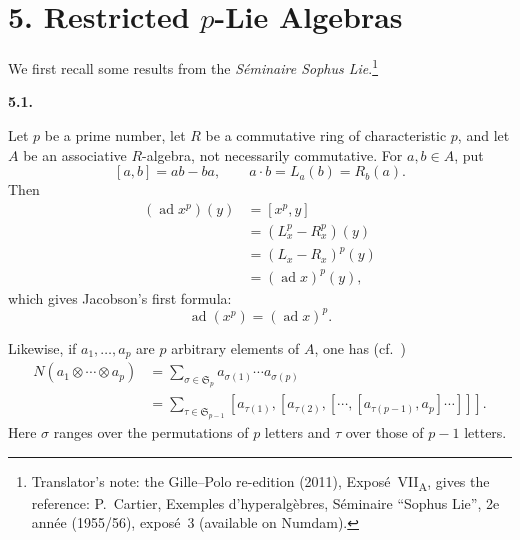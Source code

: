 
\section*{5. Restricted \texorpdfstring{\(p\)}{p}-Lie Algebras}
\label{sga3:VIIA:5}

We first recall some results from the \emph{S\'eminaire Sophus
Lie}.\footnote{Translator's note: the Gille--Polo re-edition (2011),
Expos\'e~VII\textsubscript{A}, gives the reference: P.~Cartier,
Exemples d'hyperalg\`ebres, S\'eminaire ``Sophus Lie'', 2e ann\'ee
(1955/56), expos\'e~3 (available on Numdam).}

\medskip
\noindent\textbf{5.1.}
\label{sga3:VIIA:5.1}

Let \(p\) be a prime number, let \(R\) be a commutative ring of
characteristic \(p\), and let \(A\) be an associative
\(R\)-algebra, not necessarily commutative. For \(a,b\in A\), put
\[
  [a,b]=ab-ba,
  \qquad
  a\cdot b=L_a(b)=R_b(a).
\]
Then
\[
\begin{aligned}
  (\operatorname{ad}x^p)(y)
  &=[x^p,y] \\
  &=(L_x^p-R_x^p)(y) \\
  &=(L_x-R_x)^p(y) \\
  &=(\operatorname{ad}x)^p(y),
\end{aligned}
\]
which gives Jacobson's first formula:
\[
  \tag{i}\label{sga3:vii:paragraph:5-1:equation:i}
  \operatorname{ad}(x^p)
  =
  (\operatorname{ad}x)^p.
\]

Likewise, if \(a_1,\ldots,a_p\) are \(p\) arbitrary elements of \(A\),
one has (cf.\ )
\begin{equation}
  \tag{*}\label{sga3:vii:paragraph:5-1:equation:star}
\begin{aligned}
  N(a_1\otimes\cdots\otimes a_p)
  &=
  \sum_{\sigma\in\mathfrak S_p}
    a_{\sigma(1)}\cdots a_{\sigma(p)} \\
  &=
  \sum_{\tau\in\mathfrak S_{p-1}}
  [a_{\tau(1)},
    [a_{\tau(2)},
      [\cdots,
        [a_{\tau(p-1)},a_p]
      \cdots]
    ]
  ].
\end{aligned}
\end{equation}
Here \(\sigma\) ranges over the permutations of \(p\) letters and
\(\tau\) over those of \(p-1\) letters.

